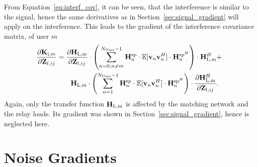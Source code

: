 From Equation~\eqref{eq:interf_cov}, it can be seen, that the interference is similar to the signal, hence the same derivatives as in Section~\ref{sec:signal_gradient} will apply on the interference.
This leads to the gradient of the interference covariance matrix, of user $m$
\begin{align}
\label{eq:interf_gradient}\nonumber
\frac{\partial\mathbf{K}_{\text{i},m}}{\partial\mathbf{Z}_{l,ij}} &= 
	\frac{\partial\mathbf{H}_\text{L,m}}{\partial\mathbf{Z}_{l,ij}} \cdot
	\left(\sum_{n=0,n\neq m}^{N_\text{User}-1} 
	 \mathbf{H}_{n}^{\text{sp}} \cdot 
	\mathbb{E}[\mathbf{v}_{n}\mathbf{v}_{n}^H] \cdot 
	\mathbf{H}_{n}^{\text{sp}^H}\right) \cdot \mathbf{H}_\text{L,m}^H + \\
 &\qquad \mathbf{H}_\text{L,m} \cdot \left(\sum_{n=1}^{N_\text{User}-1} 
	\mathbf{H}_{n}^{\text{sp}} \cdot 
	\mathbb{E}[\mathbf{v}_{n}\mathbf{v}_{n}^H] \cdot 
	\mathbf{H}_{n}^{\text{sp}^H}\right) \cdot \frac{\partial\mathbf{H}_\text{L,m}^H}{\partial\mathbf{Z}_{l,ij}}.
\end{align}
Again, only the transfer function $\mathbf{H}_\text{L,m}$ is affected by the matching network and the relay loads.
Its gradient was shown in Section~\ref{sec:signal_gradient}, hence is neglected here.

\section{Noise Gradients}
\label{sec:noise_gradient}

